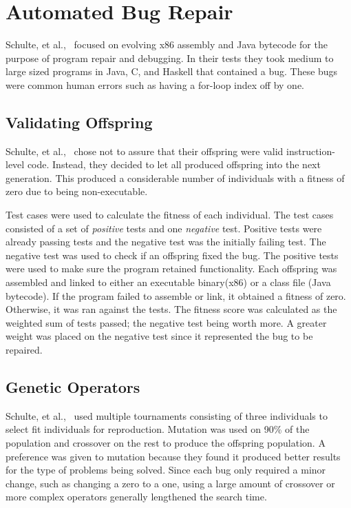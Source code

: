 \documentclass{sig-alternate}
\begin{document}
\section{Automated Bug Repair}
Schulte, et al.,~\cite{Assembly:2010} focused on evolving x86 assembly and Java bytecode for the purpose of program repair and debugging. In their tests they took medium to large sized programs in Java, C, and Haskell that contained a bug. These bugs were common human errors such as having a for-loop index off by one. 
\subsection{Validating Offspring} 
Schulte, et al.,~\cite{Assembly:2010} chose not to assure that their offspring were valid instruction-level code. Instead, they decided to let all produced offspring into the next generation. This produced a considerable number of individuals with a fitness of zero due to being non-executable.

Test cases were used to calculate the fitness of each individual. The test cases consisted of a set of \textit{positive} tests and one \textit{negative} test. Positive tests were already passing tests and the negative test was the initially failing test. The negative test was used to check if an offspring fixed the bug. The positive tests were used to make sure the program retained functionality. Each offspring was assembled and linked to either an executable binary(x86) or a class file (Java bytecode). If the program failed to assemble or link, it obtained a fitness of zero. Otherwise, it was ran against the tests. The fitness score was calculated as the weighted sum of tests passed; the negative test being worth more. A greater weight was placed on the negative test since it represented the bug to be repaired.

\subsection{Genetic Operators}
Schulte, et al.,~\cite{Assembly:2010} used multiple tournaments consisting of three individuals to select fit individuals for reproduction. Mutation was used on 90\% of the population and crossover on the rest to produce the offspring population. A preference was given to mutation because they found it produced better results for the type of problems being solved. Since each bug only required a minor change, such as changing a zero to a one, using a large amount of crossover or more complex operators generally lengthened the search time.
\end{document}
